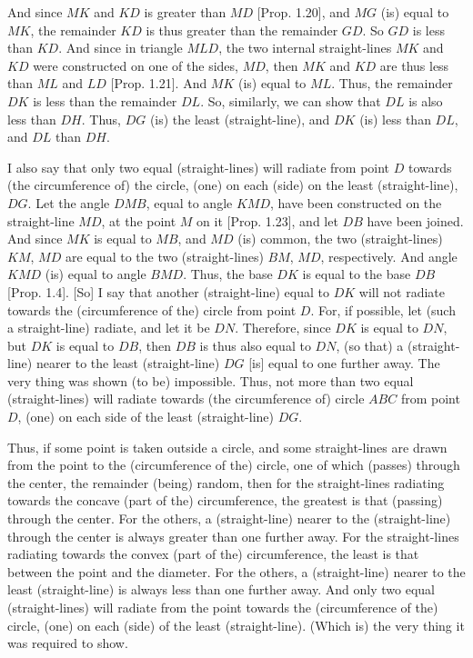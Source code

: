 \begin{Parallel}{}{}
{And since $MK$ and $KD$ is greater than $MD$ [Prop. 1.20], and $MG$ (is)
equal to $MK$, the remainder $KD$ is thus greater than the remainder $GD$.
So $GD$ is less than $KD$. And since in triangle $MLD$, the two internal straight-lines
$MK$ and $KD$ were constructed on one of the sides, $MD$, then $MK$ and $KD$
are thus less than $ML$ and $LD$  [Prop. 1.21]. And $MK$ (is) equal to $ML$.
Thus, the remainder $DK$ is less than the remainder $DL$. So, similarly, we
can show that $DL$ is also less than $DH$. Thus, $DG$ (is) the least (straight-line),
and $DK$ (is) less than $DL$, and $DL$ than $DH$.

I also say that only two equal (straight-lines) will radiate from point $D$ towards (the
circumference of) the circle, (one) on each (side) on the least (straight-line),
$DG$. Let the  angle $DMB$, equal to angle $KMD$, have been constructed
on the straight-line $MD$, at the point $M$ on it [Prop. 1.23], and  let $DB$ have been
joined. And since $MK$ is equal to $MB$, and $MD$ (is) common, the
two (straight-lines) $KM$, $MD$ are equal to the two (straight-lines) $BM$, $MD$,
respectively. And angle $KMD$ (is) equal to angle $BMD$. Thus, the base
$DK$ is equal to the base $DB$ [Prop. 1.4]. [So] I say that another (straight-line)
equal to $DK$ will not radiate towards the (circumference of the) circle
from point $D$. For, if possible, let (such a straight-line) radiate, and let
it be $DN$. Therefore, since $DK$ is equal to $DN$, but $DK$ is equal to $DB$, then $DB$
is thus also equal to $DN$, (so that) a (straight-line) nearer to the least (straight-line) $DG$ [is]
equal to one further away. The very thing was shown (to be)  impossible. 
Thus, not more than two equal (straight-lines) will radiate towards
(the circumference of) circle $ABC$ from point $D$, (one) on each side
of the least (straight-line) $DG$.

Thus, if some point is taken outside a circle, and some straight-lines are
drawn from the point to the (circumference of the) circle, one of which (passes) through the
center, the remainder  (being) random, then for the straight-lines
radiating towards the concave (part of the) circumference, the
greatest is  that (passing) through the center. For the others, a (straight-line)
nearer to the (straight-line) through the center is always greater than one
further away. For the straight-lines radiating towards the convex (part of
the) circumference, the least is that between the point and the
diameter. For the others, a (straight-line) nearer to the least
(straight-line) is always less than one further away. And only
two equal (straight-lines) will radiate from the point towards the (circumference of the) circle, (one) on each (side)
of the least (straight-line).  (Which is) the very thing it was required to show.}
\end{Parallel}



